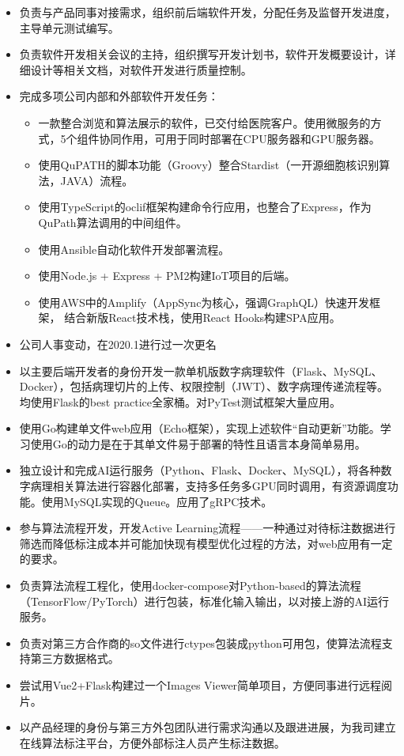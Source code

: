 \documentclass{resume}
\begin{document}
\begin{itemize}
  \item 负责与产品同事对接需求，组织前后端软件开发，分配任务及监督开发进度，主导单元测试编写。
  \item 负责软件开发相关会议的主持，组织撰写开发计划书，软件开发概要设计，详细设计等相关文档，对软件开发进行质量控制。
  \item 完成多项公司内部和外部软件开发任务：
    \begin{itemize}
    \item 一款整合浏览和算法展示的软件，已交付给医院客户。使用微服务的方式，5个组件协同作用，可用于同时部署在CPU服务器和GPU服务器。
    \item 使用QuPATH的脚本功能（Groovy）整合Stardist（一开源细胞核识别算法，JAVA）流程。
    \item 使用TypeScript的oclif框架构建命令行应用，也整合了Express，作为QuPath算法调用的中间组件。
    \item 使用Ansible自动化软件开发部署流程。
    \item 使用Node.js + Express + PM2构建IoT项目的后端。
    \item 使用AWS中的Amplify（AppSync为核心，强调GraphQL）快速开发框架，
    结合新版React技术栈，使用React Hooks构建SPA应用。
    \end{itemize}
\end{itemize}

\begin{itemize}
  \item 公司人事变动，在2020.1进行过一次更名
  \item 以主要后端开发者的身份开发一款单机版数字病理软件（Flask、MySQL、Docker），包括病理切片的上传、权限控制（JWT）、数字病理传递流程等。均使用Flask的best practice全家桶。对PyTest测试框架大量应用。
  \item 使用Go构建单文件web应用（Echo框架），实现上述软件“自动更新”功能。学习使用Go的动力是在于其单文件易于部署的特性且语言本身简单易用。
  \item 独立设计和完成AI运行服务（Python、Flask、Docker、MySQL），将各种数字病理相关算法进行容器化部署，支持多任务多GPU同时调用，有资源调度功能。使用MySQL实现的Queue。应用了gRPC技术。
  \item 参与算法流程开发，开发Active Learning流程——一种通过对待标注数据进行筛选而降低标注成本并可能加快现有模型优化过程的方法，对web应用有一定的要求。
  \item 负责算法流程工程化，使用docker-compose对Python-based的算法流程（TensorFlow/PyTorch）进行包装，标准化输入输出，以对接上游的AI运行服务。
  \item 负责对第三方合作商的so文件进行ctypes包装成python可用包，使算法流程支持第三方数据格式。
  \item 尝试用Vue2+Flask构建过一个Images Viewer简单项目，方便同事进行远程阅片。
  \item 以产品经理的身份与第三方外包团队进行需求沟通以及跟进进展，为我司建立在线算法标注平台，方便外部标注人员产生标注数据。
\end{itemize}
\end{document}
